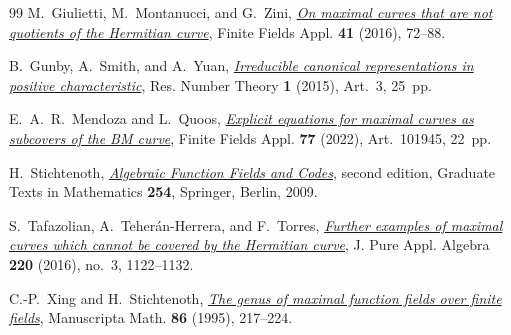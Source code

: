 \documentclass[12pt,reqno]{amsart}
\numberwithin{equation}{section}
\theoremstyle{plain}
\theoremstyle{definition}
\theoremstyle{remark}
\begin{document}
\begin{thebibliography}{99}
M.~Giulietti, M.~Montanucci, and G.~Zini,
\href{https://doi.org/10.1016/j.ffa.2016.05.005}{\emph{On maximal curves that are not quotients of the Hermitian curve}},
Finite Fields Appl. \textbf{41} (2016), 72--88.

B.~Gunby, A.~Smith, and A.~Yuan,
\href{https://doi.org/10.1007/s40993-015-0004-8}{\emph{Irreducible canonical representations in positive characteristic}},
Res. Number Theory \textbf{1} (2015), Art.~3, 25~pp.

E.~A.~R.~Mendoza and L.~Quoos,
\href{https://doi.org/10.1016/j.ffa.2021.101945}{\emph{Explicit equations for maximal curves as subcovers of the BM curve}},
Finite Fields Appl. \textbf{77} (2022), Art.~101945, 22~pp.

H.~Stichtenoth,
\href{https://doi.org/10.1007/978-3-540-76878-4}{\emph{Algebraic Function Fields and Codes}}, second edition,
Graduate Texts in Mathematics \textbf{254}, Springer, Berlin, 2009.

S.~Tafazolian, A.~Teher\'an-Herrera, and F.~Torres,
\href{https://doi.org/10.1016/j.jpaa.2015.08.010}{\emph{Further examples of maximal curves which cannot be covered by the Hermitian curve}},
J. Pure Appl. Algebra \textbf{220} (2016), no.~3, 1122--1132.

C.-P.~Xing and H.~Stichtenoth,
\href{https://doi.org/10.1007/BF02567990}{\emph{The genus of maximal function fields over finite fields}},
Manuscripta Math. \textbf{86} (1995), 217--224.

\end{thebibliography}
\end{document}
